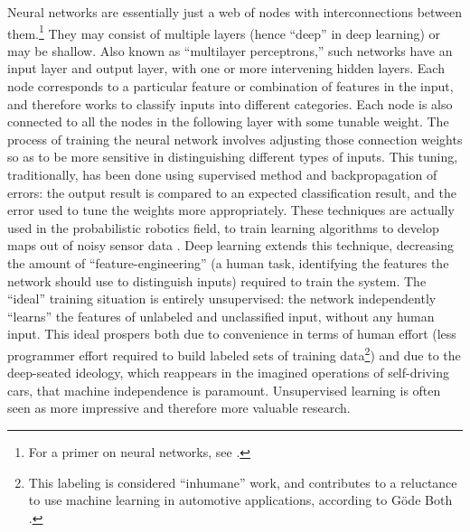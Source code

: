 
Neural networks are essentially just a web of nodes with
interconnections between them.\footnote{For a primer on neural
  networks, see \cite{neuralJordan}.} They may consist of multiple layers
(hence ``deep'' in deep learning) or may be shallow. Also known as
``multilayer perceptrons,'' such networks have an input layer and
output layer, with one or more intervening hidden layers. Each node
corresponds to a particular feature or combination of features in the
input, and therefore works to classify inputs into different
categories. Each node is also connected to all the nodes in the
following layer with some tunable weight. The process of training the
neural network involves adjusting those connection weights so as to
be more sensitive in distinguishing different types of
inputs. This tuning,
traditionally, has been done using supervised method and
backpropagation of errors: the output result is compared to an
expected classification result, and the error used to tune the weights
more appropriately. These techniques are actually used in the
probabilistic robotics field, to train learning algorithms to develop
maps out of noisy sensor data \cite[p. 284-297]{thrunProb}. Deep
learning extends this technique, decreasing 
the amount of ``feature-engineering'' (a human task, identifying the
features the network should use to distinguish inputs) required to
train the system. The ``ideal'' training situation is entirely
unsupervised: the network independently ``learns'' the features of
unlabeled and unclassified input, without any human input. This ideal
prospers both due to convenience in terms of human effort (less
programmer effort required to build labeled sets of training
data\footnote{This labeling is considered ``inhumane'' work, and contributes to
a reluctance to use machine learning in automotive applications,
according to G\"{o}de Both \cite{bothpt2}.}) and
due to the deep-seated ideology, which reappears in the imagined
operations of self-driving cars, that machine independence is
paramount. Unsupervised learning is often seen as more impressive and
therefore more valuable research.

